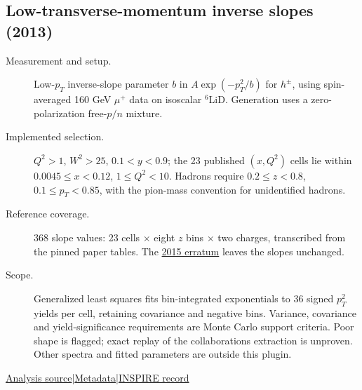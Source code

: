 \documentclass[11pt,a4paper]{article}
\newcommand{\id}[1]{{\small\texttt{\detokenize{#1}}}}
\begin{document}
\subsection{\texorpdfstring{Low-transverse-momentum inverse slopes (2013)}{Low-transverse-momentum inverse slopes (2013)}}
\id{COMPASS_2013_I1236358}\quad\cite{r1236358}
\begin{description}
\item[Measurement and setup.] Low-$p_T$ inverse-slope parameter $b$ in $A\exp(-p_T^2/b)$ for $h^\pm$, using spin-averaged 160 GeV $\mu^+$ data on isoscalar $^6$LiD. Generation uses a zero-polarization free-$p/n$ mixture.
\item[Implemented selection.] $Q^2>1$, $W^2>25$, $0.1<y<0.9$; the 23 published $(x,Q^2)$ cells lie within $0.0045\le x<0.12$, $1\le Q^2<10$. Hadrons require $0.2\le z<0.8$, $0.1\le p_T<0.85$, with the pion-mass convention for unidentified hadrons.
\item[Reference coverage.] 368 slope values: 23 cells $\times$ eight $z$ bins $\times$ two charges, transcribed from the pinned paper tables. The \href{https://doi.org/10.1140/epjc/s10052-014-3255-y}{2015 erratum} leaves the slopes unchanged.
\item[Scope.] Generalized least squares fits bin-integrated exponentials to 36 signed $p_T^2$ yields per cell, retaining covariance and negative bins. Variance, covariance and yield-significance requirements are Monte Carlo support criteria. Poor shape is flagged; exact replay of the collaboration\textquotesingle s extraction is unproven. Other spectra and fitted parameters are outside this plugin.
\end{description}
{\small\href{https://github.com/apapaefs/HerwigPolarizedPheno/blob/105045bd757aaa6b217e87811dc5f9a22a8d1cef/analyses/rivet/dis/COMPASS_2013_I1236358.cc}{Analysis source}\quad|\quad\href{https://github.com/apapaefs/HerwigPolarizedPheno/blob/105045bd757aaa6b217e87811dc5f9a22a8d1cef/analyses/rivet/dis/COMPASS_2013_I1236358.info}{Metadata}\quad|\quad\href{https://inspirehep.net/literature/1236358}{INSPIRE record}}

\clearpage
{}
\end{document}
